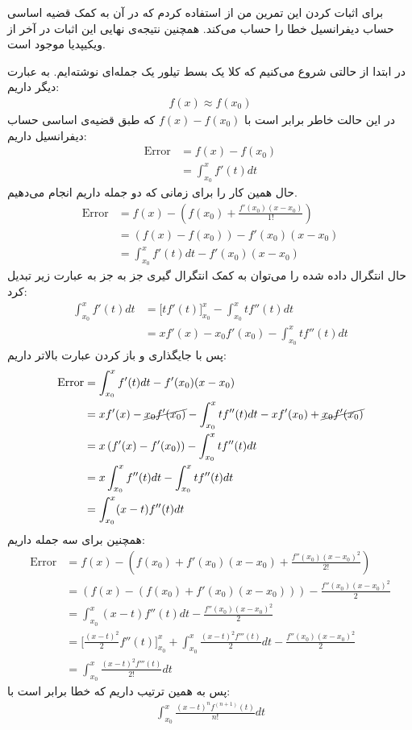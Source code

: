 \documentclass[]{article}
\begin{document}
\printheader

برای اثبات کردن این تمرین من از
استفاده کردم که در آن به کمک قضیه اساسی حساب دیفرانسیل خطا را حساب می‌کند.
همچنین نتیجه‌ی نهایی این اثبات در آخر
از ویکیپدیا موجود است.

در ابتدا از حالتی شروع می‌کنیم که کلا یک بسط تیلور یک جمله‌ای نوشته‌ایم. به عبارت دیگر داریم:
\begin{gather*}
    f(x) \approx f(x_0)
\end{gather*}
در این حالت خاطر برابر است با
$f(x) - f(x_0)$
که طبق قضیه‌ی اساسی حساب دیفرانسیل داریم:
\begin{align*}
    \text{Error} &= f(x) - f(x_0)\\
    &= \int_{x_0}^{x} f'(t) dt
\end{align*}
حال همین کار را برای زمانی که دو جمله داریم انجام می‌دهیم.
\begin{align*}
    \text{Error} &= f(x) - \left(f(x_0) + \frac{f'(x_0)(x-x_0)}{1!}\right)\\
    &= \left(f(x) - f(x_0)\right) - f'(x_0)(x-x_0)\\
    &= \int_{x_0}^{x} f'(t) dt - f'(x_0)(x-x_0)
\end{align*}
حال انتگرال داده شده را می‌توان به کمک انتگرال گیری جز به جز به عبارت زیر تبدیل کرد:
\begin{align*}
    \int_{x_0}^{x} f'(t) dt &= \Big[t f'(t)\Big]_{x_0}^{x} - \int_{x_0}^{x} t f''(t) dt\\
    &= x f'(x) - x_0 f'(x_0) - \int_{x_0}^{x} t f''(t) dt
\end{align*}
پس با جایگذاری و باز کردن عبارت بالاتر داریم:
\begin{align*}
    \text{Error} &= \int_{x_0}^{x} f'(t) dt - f'(x_0)(x-x_0)\\
    &= x f'(x) - \cancel{x_0 f'(x_0)} - \int_{x_0}^{x} t f''(t) dt - xf'(x_0) + \cancel{x_0f'(x_0)}\\
    &= x \left(f'(x) - f'(x_0)\right) - \int_{x_0}^{x} t f''(t) dt \\
    &= x \int_{x_0}^{x} f''(t) dt - \int_{x_0}^{x} t f''(t) dt \\
    &= \int_{x_0}^{x} (x - t) f''(t) dt
\end{align*}
همچنین برای سه جمله داریم:
\begin{align*}
    \text{Error} &= f(x) - \left(f(x_0) + f'(x_0)(x-x_0) + \frac{f''(x_0)(x-x_0)^2}{2!}\right)\\
    &= \left(f(x) - \left(f(x_0) + f'(x_0)(x-x_0)\right)\right) - \frac{f''(x_0)(x-x_0)^2}{2}\\
    &= \int_{x_0}^{x} (x - t) f''(t) dt - \frac{f''(x_0)(x-x_0)^2}{2}\\
    &= \Big[\frac{(x-t)^2}{2} f''(t)\Big]_{x_0}^{x} + \int_{x_0}^{x} \frac{(x-t)^2 f'''(t)}{2} dt - \frac{f''(x_0)(x-x_0)^2}{2}\\
    &= \int_{x_0}^{x} \frac{(x-t)^2 f'''(t)}{2!} dt
\end{align*}
پس به همین ترتیب داریم که خطا برابر است با:
\begin{gather*}
    \int_{x_0}^{x} \frac{(x-t)^n f^{(n+1)}(t)}{n!} dt
\end{gather*}
\end{document}
